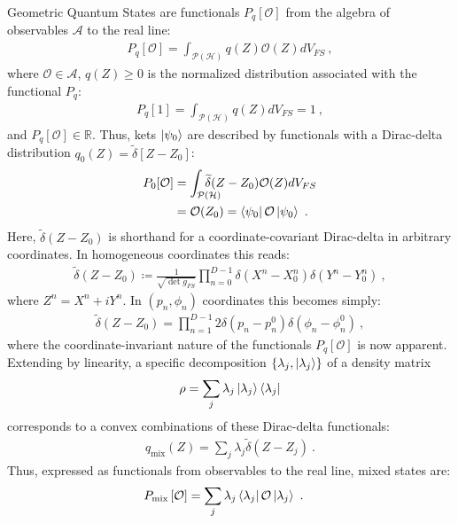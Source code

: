 \documentclass[draft,nofootinbib,pre,twocolumn,showpacs,showkeys,preprintnumbers,floatfix]{revtex4-1}
\newcommand{\1}{\mathbbm{1}}
\newcommand{\intP}{\int_{\mathcal{P}(\mathcal{H})} \!\!\!\!\!\!\!\!\!}
\begin{document}
Geometric Quantum States are functionals $P_q[\mathcal{O}]$ from the algebra of
observables $\mathcal{A}$ to the real line: 
\begin{align}
P_q[\mathcal{O}]
  = \int_{\mathcal{P}(\mathcal{H})} q(Z) \mathcal{O}(Z) dV_{FS}
  ~,
\label{eq:gqs}
\end{align}
where $\mathcal{O} \in \mathcal{A}$, $q(Z) \geq 0$ is the
normalized distribution associated with the functional $P_q$:
\begin{align*}
P_q[1] = \int_{\mathcal{P}(\mathcal{H})}
  q(Z) dV_{FS}  = 1
  ~,
\end{align*}
and $P_q[\mathcal{O}] \in \mathbb{R}$. 
Thus, kets $\ket{\psi_0}$ are described by functionals with a Dirac-delta
distribution $q_0(Z) = \widetilde{\delta}\left[ Z - Z_0\right]$:
\begin{align*}
P_{0}[\mathcal{O}] &= \intP \widetilde{\delta}(Z-Z_0)\mathcal{O}(Z) dV_{FS} \\
  & = \mathcal{O}(Z_0)  = \bra{\psi_0}\mathcal{O}\ket{\psi_0}
  ~.
\end{align*}
Here, $\widetilde{\delta}(Z-Z_0)$ is shorthand for a coordinate-covariant Dirac-delta in
arbitrary coordinates. In homogeneous coordinates this reads:
\begin{align*}
\widetilde{\delta}(Z - Z_0) \coloneqq \frac{1}{\sqrt{\det g_{FS}}}
  \prod_{n=0}^{D-1} \delta(X^n - X^n_0)
  \delta(Y^n - Y^n_0)
  ~,
\end{align*}
where $Z^n = X^n + iY^n$. In $(p_n,\phi_n)$ coordinates
this becomes simply:
\begin{align*}
\widetilde{\delta}(Z - Z_0) = \prod_{n=1}^{D-1} 2\delta(p_n - p_n^0) \delta(\phi_n - \phi_n^0)
  ~,
\end{align*}
where the coordinate-invariant nature of the functionals $P_q[\mathcal{O}]$ is
now apparent. Extending by linearity, a specific decomposition $\left\{ \lambda_j, \ket{\lambda_j}\right\}$
of a density matrix
\begin{align*}
\rho = \sum_{j}\lambda_j \ket{\lambda_j}\bra{\lambda_j}
\end{align*}
corresponds to a convex combinations of these Dirac-delta functionals:
\begin{align*}
q_{\mathrm{mix}}(Z) = \sum_{j}\lambda_j \widetilde{\delta}(Z-Z_j)
  ~. 
\end{align*}
Thus, expressed as functionals from observables to the real line, mixed states
are:
\begin{align}
P_{\mathrm{mix}}\left[ \mathcal{O}\right]
  & = \sum_{j} \lambda_j \bra{\lambda_j}\mathcal{O}\ket{\lambda_j}
  ~.
\label{eq:Functional}
\end{align}
 
\end{document}
